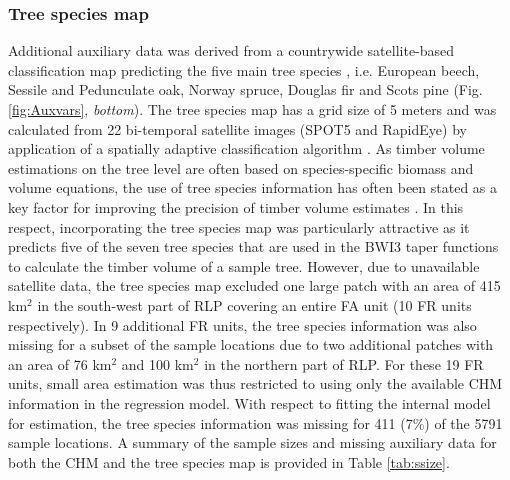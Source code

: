 \subsubsection{Tree species map}
\label{sec:tspecclass}

Additional auxiliary data was derived from a countrywide satellite-based classification map predicting the five main tree species \citep{stoffels2015}, i.e. European beech, Sessile and Pedunculate oak, Norway spruce, Douglas fir and Scots pine (Fig. \ref{fig:Auxvars}, \textit{bottom}). The tree species map has a grid size of 5 meters and was calculated from 22 bi-temporal satellite images (SPOT5 and RapidEye) by application of a spatially adaptive classification algorithm \citep{stoffels2012}. As timber volume estimations on the tree level are often based on species-specific biomass and volume equations, the use of tree species information has often been stated as a key factor for improving the precision of timber volume estimates \cite{white2016}. In this respect, incorporating the tree species map was particularly attractive as it predicts five of the seven tree species that are used in the BWI3 taper functions \citep{kublin2013} to calculate the timber volume of a sample tree. However, due to unavailable satellite data, the tree species map excluded one large patch with an area of 415 km$^2$ in the south-west part of RLP covering an entire FA unit (10 FR units respectively). In 9 additional FR units, the tree species information was also missing for a subset of the sample locations due to two additional patches with an area of 76 km$^2$ and 100 km$^2$ in the northern part of RLP. For these 19 FR units, small area estimation was thus restricted to using only the available CHM information in the regression model. With respect to fitting the internal model for estimation, the tree species information was missing for 411 (7\%) of the 5791 sample locations. A summary of the sample sizes and missing auxiliary data for both the CHM and the tree species map is provided in Table \ref{tab:ssize}.

